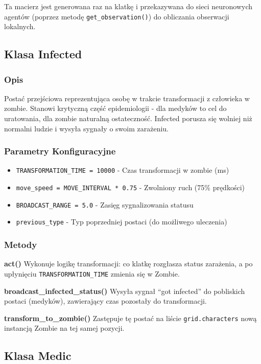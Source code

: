 \documentclass[12pt,a4paper]{article}
\begin{document}
Ta macierz jest generowana raz na klatkę i przekazywana do sieci neuronowych
agentów (poprzez metodę \texttt{get\_observation()}) do obliczania obserwacji
lokalnych.

\subsection{Klasa Infected}

\subsubsection{Opis}
Postać przejściowa reprezentująca osobę w trakcie transformacji z człowieka w
zombie. Stanowi krytyczną część epidemiologii - dla medyków to cel do
uratowania, dla zombie naturalną ostateczność. Infected porusza się wolniej niż
normalni ludzie i wysyła sygnały o swoim zarażeniu.

\subsubsection{Parametry Konfiguracyjne}
\begin{itemize}
	\item \texttt{TRANSFORMATION\_TIME = 10000} - Czas transformacji w zombie (ms)
	\item \texttt{move\_speed = MOVE\_INTERVAL * 0.75} - Zwolniony ruch (75\% prędkości)
	\item \texttt{BROADCAST\_RANGE = 5.0} - Zasięg sygnalizowania statusu
	\item \texttt{previous\_type} - Typ poprzedniej postaci (do możliwego uleczenia)
\end{itemize}

\subsubsection{Metody}

\textbf{act()}
Wykonuje logikę transformacji: co klatkę rozgłasza status zarażenia, a po upłynięciu \texttt{TRANSFORMATION\_TIME} zmienia się w Zombie.

\textbf{broadcast\_infected\_status()}
Wysyła sygnał ``got infected'' do pobliskich postaci (medyków), zawierający czas pozostały do transformacji.

\textbf{transform\_to\_zombie()}
Zastępuje tę postać na liście \texttt{grid.characters} nową instancją Zombie na tej samej pozycji.

\subsection{Klasa Medic}
\end{document}
